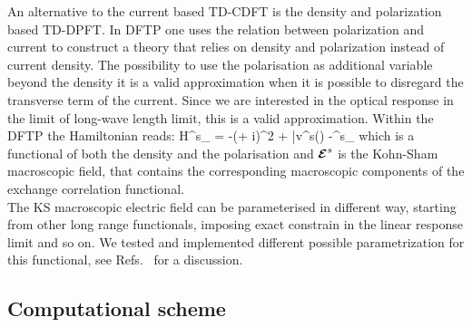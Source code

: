 An alternative to the current based TD-CDFT is the density and polarization based TD-DPFT. In DFTP one uses the relation between polarization and current to construct a theory that relies on density and polarization instead of current density. The possibility to use the polarisation as additional variable beyond the density it is a valid approximation when it is possible to disregard the transverse term of the current. Since we are interested in the optical response in the limit of long-wave length limit, this is a valid approximation. Within the DFTP the Hamiltonian reads:
\be \label{eq:dpftks}
H^{s}_\kk
= -\left(\nabla + i\kk\right )^2 + \bar v^{s}(\rr) -\Omega\Efield^{s}\cdot \nabla_\kk %
\ee
which is a functional of both the density and the polarisation and $\boldsymbol{\cal E}^{s}$ is the Kohn-Sham macroscopic field, that contains the corresponding macroscopic components of the exchange correlation functional.\\ 
The KS macroscopic electric field can be parameterised in different way, starting from other long range functionals, imposing exact constrain in the linear response limit and so on. We tested and implemented different possible parametrization for this functional, see Refs.~ for a discussion.
\subsection{Computational scheme}\label{sc:compdet}

